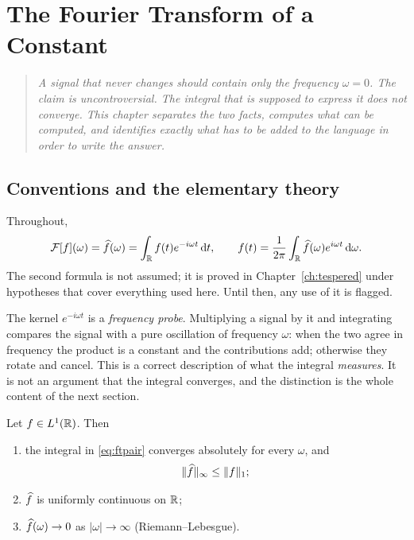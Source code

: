 \chapter{The Fourier Transform of a Constant}
\label{ch:constant}

\begin{quote}
\itshape
A signal that never changes should contain only the frequency $\omega=0$. The claim is
uncontroversial. The integral that is supposed to express it does not converge. This chapter
separates the two facts, computes what can be computed, and identifies exactly what has to be
added to the language in order to write the answer.
\end{quote}

\section{Conventions and the elementary theory}

Throughout,
\begin{equation}
\mathcal{F}[f](\omega)=\widehat{f}(\omega)=\int_{\mathbb{R}} f(t)e^{-i\omega t}\,\mathrm{d} t ,
\qquad
f(t)=\frac{1}{2\pi}\int_{\mathbb{R}}\widehat{f}(\omega)e^{i\omega t}\,\mathrm{d}\omega .
\label{eq:ftpair}
\end{equation}
The second formula is not assumed; it is proved in Chapter~\ref{ch:tespered} under hypotheses that
cover everything used here. Until then, any use of it is flagged.

The kernel $e^{-i\omega t}$ is a \emph{frequency probe}. Multiplying a signal by it and integrating
compares the signal with a pure oscillation of frequency $\omega$: when the two agree in frequency
the product is a constant and the contributions add; otherwise they rotate and cancel. This is a
correct description of what the integral \emph{measures}. It is not an argument that the integral
converges, and the distinction is the whole content of the next section.

\begin{proposition}\label{prop:L1}
Let $f\in L^{1}(\mathbb{R})$. Then
\begin{enumerate}
\item the integral in \eqref{eq:ftpair} converges absolutely for every $\omega$, and
\begin{equation}
\|\widehat{f}\|_{\infty}\le\|f\|_{1};
\label{eq:L1bound}
\end{equation}
\item $\widehat{f}$ is uniformly continuous on $\mathbb{R}$;
\item $\widehat{f}(\omega)\to 0$ as $|\omega|\to\infty$ \textup{(Riemann--Lebesgue)}.
\end{enumerate}
\end{proposition}

